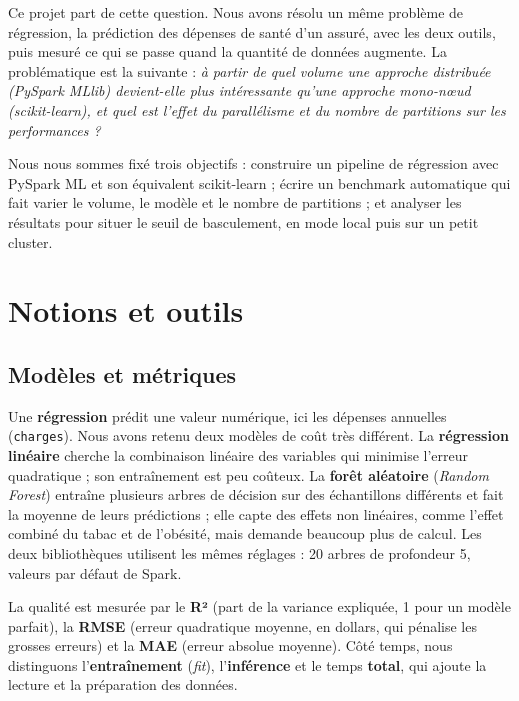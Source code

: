 \documentclass[11pt,a4paper]{article}
\newcommand{\code}[1]{\texttt{#1}}
\begin{document}
Ce projet part de cette question. Nous avons résolu un même problème de régression, la prédiction des
dépenses de santé d'un assuré, avec les deux outils, puis mesuré ce qui se passe quand la quantité de
données augmente. La problématique est la suivante : \emph{à partir de quel volume une approche
distribuée (PySpark MLlib) devient-elle plus intéressante qu'une approche mono-nœud (scikit-learn), et
quel est l'effet du parallélisme et du nombre de partitions sur les performances ?}

Nous nous sommes fixé trois objectifs : construire un pipeline de régression avec PySpark ML et son
équivalent scikit-learn ; écrire un benchmark automatique qui fait varier le volume, le modèle et le
nombre de partitions ; et analyser les résultats pour situer le seuil de basculement, en mode local
puis sur un petit cluster.

\section{Notions et outils}

\subsection{Modèles et métriques}

Une \textbf{régression} prédit une valeur numérique, ici les dépenses annuelles (\code{charges}).
Nous avons retenu deux modèles de coût très différent. La \textbf{régression linéaire} cherche la
combinaison linéaire des variables qui minimise l'erreur quadratique ; son entraînement est peu
coûteux. La \textbf{forêt aléatoire} (\emph{Random Forest}) entraîne plusieurs arbres de décision sur
des échantillons différents et fait la moyenne de leurs prédictions ; elle capte des effets non
linéaires, comme l'effet combiné du tabac et de l'obésité, mais demande beaucoup plus de calcul. Les
deux bibliothèques utilisent les mêmes réglages : 20 arbres de profondeur 5, valeurs par défaut de
Spark.

La qualité est mesurée par le \textbf{R²} (part de la variance expliquée, 1 pour un modèle parfait),
la \textbf{RMSE} (erreur quadratique moyenne, en dollars, qui pénalise les grosses erreurs) et la
\textbf{MAE} (erreur absolue moyenne). Côté temps, nous distinguons l'\textbf{entraînement}
(\emph{fit}), l'\textbf{inférence} et le temps \textbf{total}, qui ajoute la lecture et la
préparation des données.
\end{document}
